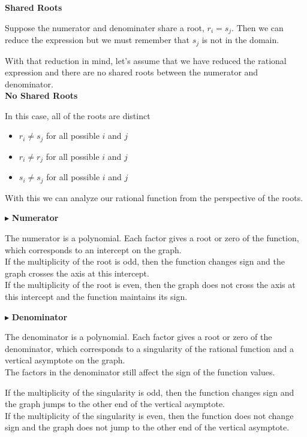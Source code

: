 \documentclass{ximera}
\begin{document}
\textbf{Shared Roots}

Suppose the numerator and denominater share a root, $r_i = s_j$.  Then we can reduce the expression but we must remember that $s_j$ is not in the domain.


With that reduction in mind, let's assume that we have reduced the rational expression and there are no shared roots between the numerator and denominator. \\




\textbf{No Shared Roots}

In this case, all of the roots are distinct

\begin{itemize}
\item $r_i \ne s_j$ for all possible $i$ and $j$
\item $r_i \ne r_j$ for all possible $i$ and $j$
\item $s_i \ne s_j$ for all possible $i$ and $j$
\end{itemize}


With this we can analyze our rational function from the perspective of the roots.



$\blacktriangleright$ \textbf{Numerator}



The numerator is a polynomial.  Each factor gives a root or zero of the function, which corresponds to an intercept on the graph. \\

If the multiplicity of the root is odd, then the function changes sign and the graph crosses the axis at this intercept.  \\
If the multiplicity of the root is even, then the graph does not cross the axis at this intercept and the function maintains its sign. 






$\blacktriangleright$ \textbf{Denominator}


The denominator is a polynomial.  Each factor gives a root or zero of the denominator, which corresponds to a singularity of the rational function and a vertical asymptote on the graph. \\


The factors in the denominator still affect the sign of the function values.


If the multiplicity of the singularity is odd, then the function changes sign and the graph jumps to the other end of the vertical asymptote.  \\
If the multiplicity of the singularity is even, then the function does not change sign and the graph does not jump to the other end of the vertical asymptote. 
\end{document}
